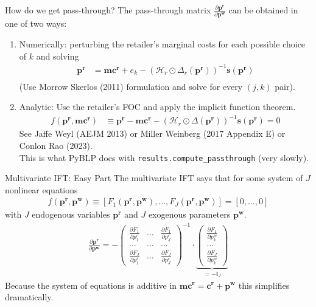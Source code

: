 \documentclass[aspectratio=169,10pt]{beamer}
\begin{document}
\begin{frame}{How do we get pass-through?}
The \alert{pass-through matrix} $\frac{\partial \symbf{p^r}}{\partial \symbf{p^w}}$ can be obtained in one of two ways:
\begin{enumerate}
\item Numerically: perturbing the retailer's marginal costs for each possible choice of $k$ and solving
\begin{align*}
\symbf{p^r} &=\symbf{mc^r} + e_k -(\mathcal{H}_r \odot \Delta_{r}(\symbf{p^r}))^{-1} \symbf{s}(\symbf{p^r})\\
\end{align*}
(Use Morrow Skerlos (2011) formulation and solve for every $(j,k)$ pair).
\item Analytic: Use the retailer's FOC and apply the implicit function theorem.
\begin{align}
\tag{retailer FOC}
 f(\symbf{p^r},\symbf{mc^r}) &\equiv \symbf{p^r}  - \symbf{mc^r}-  \left(\mathcal{H}_{r} \odot \Delta(\symbf{p^r}) \right)^{-1} \symbf{s}(\symbf{p^r})=0 
\end{align}
See Jaffe Weyl (AEJM 2013) or Miller Weinberg (2017 Appendix E) or Conlon Rao (2023).\\
\alert{This is what PyBLP does} with \texttt{results.compute\_passthrough} (very slowly).
\end{enumerate}
\end{frame}



\begin{frame}{Multivariate IFT: Easy Part}
The multivariate IFT says that for some system of $J$ nonlinear equations 
\begin{align*}
f(\symbf{p^r},\symbf{p^w}) \equiv [F_1(\symbf{p^r},\symbf{p^w}), \ldots, F_J(\symbf{p^r},\symbf{p^w})]=[0,\ldots,0]
\end{align*}
with $J$ endogenous variables $\symbf{p^r}$ and $J$ exogenous parameters $\symbf{p^w}$.
\begin{align}
\label{eq:ptr_matrix}
\tag{PTR}
\frac{\partial \symbf{p^r}}{\partial \symbf{p^w}}
=-\left(\begin{array}{ccc}
\frac{\partial F_{1}}{\partial p_{1}^r} & \ldots & \frac{\partial F_{1}}{\partial p_{J}^r} \\
\ldots & \ldots & \ldots \\
\frac{\partial F_{J}}{\partial p_{1}^r} & \ldots & \frac{\partial F_{J}}{\partial p_{J}^r}
\end{array}\right)^{-1} \cdot \underbrace{\left(\begin{array}{l}
\frac{\partial F_{1}}{\partial p_{k}^w} \\
\ldots \\
\frac{\partial F_{J}}{\partial p_{k}^w}
\end{array}\right)}_{= -\mathbb{I}_J}
\end{align}
Because the system of equations is additive in $\symbf{mc^r} = \symbf{c^r} + \symbf{p^w}$ this simplifies dramatically.
\end{frame}
\end{document}
